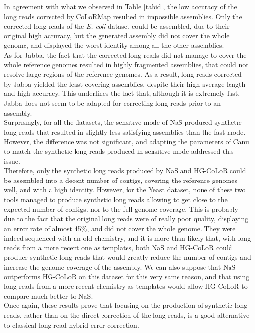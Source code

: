 \documentclass[long, final]{jobim2017}
\begin{document}
In agreement with what we observed in \hyperref[tabid]{Table \ref*{tabid}}, the low accuracy of the long reads corrected by CoLoRMap resulted in impossible assemblies. Only the corrected long reads of the \emph{E. coli} dataset could be assembled, due to their original high accuracy, but the generated assembly did not cover the whole genome, and displayed the worst identity among all the other assemblies. \\
\indent As for Jabba, the fact that the corrected long reads did not manage to cover the whole reference genomes resulted in highly fragmented assemblies, that could not resolve large regions of the reference genomes. As a result, long reads corrected by Jabba yielded the least covering assemblies, despite their high average length and high accuracy. This underlines the fact that, although it is extremely fast, Jabba does not seem to be adapted for correcting long reads prior to an assembly. \\
\indent Surprisingly, for all the datasets, the sensitive mode of NaS produced synthetic long reads that resulted in slightly less satisfying assemblies than the fast mode. However, the difference was not significant, and adapting the parameters of Canu to match the synthetic long reads produced in sensitive mode addressed this issue. \\
\indent Therefore, only the synthetic long reads produced by NaS and HG-CoLoR could be assembled into a decent number of contigs, covering the reference genomes well, and with a high identity. However, for the Yeast dataset, none of these two tools managed to produce synthetic long reads allowing to get close to the expected number of contigs, nor to the full genome coverage. This is probably due to the fact that the original long reads were of really poor quality, displaying an error rate of almost 45\%, and did not cover the whole genome. They were indeed sequenced with an old chemistry, and it is more than likely that, with long reads from a more recent one as templates, both NaS and HG-CoLoR could produce synthetic long reads that would greatly reduce the number of contigs and increase the genome coverage of the assembly. We can also suppose that NaS outperforms HG-CoLoR on this dataset for this very same reason, and that using long reads from a more recent chemistry as templates would allow HG-CoLoR to compare much better to NaS. \\
\indent Once again, these results prove that focusing on the production of synthetic long reads, rather than on the direct correction of the long reads, is a good alternative to classical long read hybrid error correction.
\end{document}
